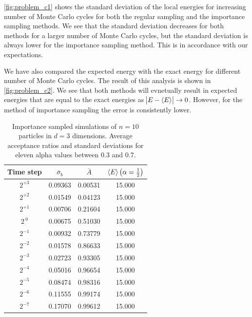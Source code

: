 \documentclass[
    a4paper, aps, twocolumn, floatfix, superscriptaddress, nofootinbib]{revtex4-1}
\newcommand{\1}{\mathds{1}}
\begin{document}
	\autoref{fig:problem_c1} shows the standard deviation of the local energies for increasing number of Monte
	Carlo cycles for both the regular sampling and the importance sampling methods. We see that the standard 
	deviation decreases for both methods for a larger number of Monte Carlo cycles, but the standard deviation
	is always lower for the importance sampling method. This is in accordance with our expectations.
	
	We have also compared the expected energy with the exact energy for different number of Monte Carlo
	cycles. The result of this analysis is shown in \autoref{fig:problem_c2}. We see that both methods will  evnetually 
	result in expected energies that are equal to the exact energies as $\abs{E - \expval{E}} \to 0$. However, for the 
	method of importance sampling the error is consistently lower. 
	
	\begin{table}
		\caption{Importance sampled simulations of $n=10$ particles in $d=3$ dimensions. Average acceptance
			ratios and standard deviations for eleven alpha values between $0.3$ and $0.7$.}
		\centering
			\begin{ruledtabular}
				\begin{tabular}{cccc}
				Time step & $\bar{\sigma}_b$ & $\bar{A}$ & $\expval{E}\left(\alpha = \frac{1}{2}\right)$ \\ \hline
				$2^{+3}$ & 0.09363 & 0.00531 & 15.000 \\
				$2^{+2}$ & 0.01549  & 0.04123 & 15.000 \\
				$2^{+1}$ & 0.00706 & 0.21604 & 15.000 \\ 
				$2^{\ 0}$ & 0.00675 & 0.51030 & 15.000 \\
				$2^{-1}$ & 0.00932 & 0.73779 & 15.000 \\
				$2^{-2}$ & 0.01578 & 0.86633 & 15.000 \\
				$2^{-3}$ & 0.02723 & 0.93305 & 15.000 \\
				$2^{-4}$ & 0.05016 & 0.96654 & 15.000 \\
				$2^{-5}$ & 0.08474 & 0.98316 & 15.000 \\
				$2^{-6}$ & 0.11555 & 0.99174 & 15.000 \\
				$2^{-7}$ & 0.17070 & 0.99612 & 15.000 \\
				\end{tabular}
			\end{ruledtabular}
			\label{tab:imp_time_step}
	\end{table}
	
\end{document}
